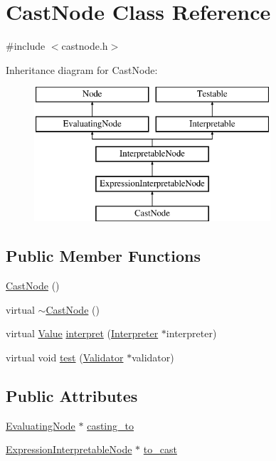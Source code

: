 \hypertarget{classCastNode}{}\section{Cast\+Node Class Reference}
\label{classCastNode}


{\ttfamily \#include $<$castnode.\+h$>$}

Inheritance diagram for Cast\+Node\+:\begin{figure}[H]
\begin{center}
\leavevmode
\includegraphics[height=5.000000cm]{classCastNode}
\end{center}
\end{figure}
\subsection*{Public Member Functions}
\begin{DoxyCompactItemize}
\item 
\hyperlink{classCastNode_aacc7aea8e67a26de47f9a9a175cad3e2}{Cast\+Node} ()
\item 
virtual \hyperlink{classCastNode_a358bc9d180542920fced2b7f35ef3f9f}{$\sim$\+Cast\+Node} ()
\item 
virtual \hyperlink{classValue}{Value} \hyperlink{classCastNode_a2a909a7531791bcbc53c514a01ce5024}{interpret} (\hyperlink{classInterpreter}{Interpreter} $\ast$interpreter)
\item 
virtual void \hyperlink{classCastNode_a19fa03c324a6dcbadac32965a86afb3e}{test} (\hyperlink{classValidator}{Validator} $\ast$validator)
\end{DoxyCompactItemize}
\subsection*{Public Attributes}
\begin{DoxyCompactItemize}
\item 
\hyperlink{classEvaluatingNode}{Evaluating\+Node} $\ast$ \hyperlink{classCastNode_adc7612dd690f94026adeea0d98970b57}{casting\+\_\+to}
\item 
\hyperlink{classExpressionInterpretableNode}{Expression\+Interpretable\+Node} $\ast$ \hyperlink{classCastNode_a01fc0556ce65230a77941f1519b72769}{to\+\_\+cast}
\end{DoxyCompactItemize}

